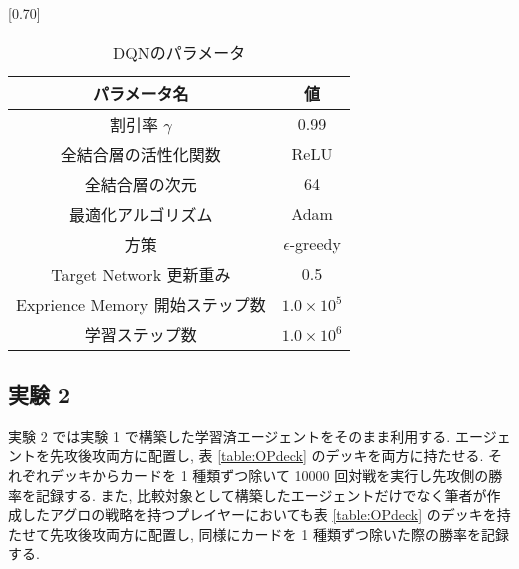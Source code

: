 \documentclass[twocolumn]{jarticle}     %
\begin{document}
       \begin{table}[t]
         \centering
         \caption{DQNのパラメータ}
         \vspace{-0.3cm}
         \label{table:dqnparam}
         \scalebox{0.70}[0.70]{
           \begin{tabular}{|c|c|}
             \hline
             パラメータ名 & 値 \\ \hline \hline
             割引率 $\gamma$ & 0.99 \\ \hline     
             全結合層の活性化関数             & ReLU     \\ \hline
             全結合層の次元                & 64       \\ \hline
             最適化アルゴリズム              & Adam     \\ \hline
             方策                 & $\epsilon$-greedy \\ \hline
             Target Network 更新重み              & 0.5     \\ \hline
             Exprience Memory 開始ステップ数 & $1.0 \times 10^5$ \\ \hline
             学習ステップ数 &  $1.0 \times 10^6$ \\ \hline
             \end{tabular}
         }
         \end{table}
\subsection{実験 2}
実験 2 では実験 1 で構築した学習済エージェントをそのまま利用する. 
エージェントを先攻後攻両方に配置し, 表 \ref{table:OPdeck} のデッキを両方に持たせる. それぞれデッキからカードを 1 種類ずつ除いて 10000 回対戦を実行し先攻側の勝率を記録する. また, 比較対象として構築したエージェントだけでなく筆者が作成したアグロの戦略を持つプレイヤーにおいても表 \ref{table:OPdeck} のデッキを持たせて先攻後攻両方に配置し, 同様にカードを 1 種類ずつ除いた際の勝率を記録する.
\end{document}
